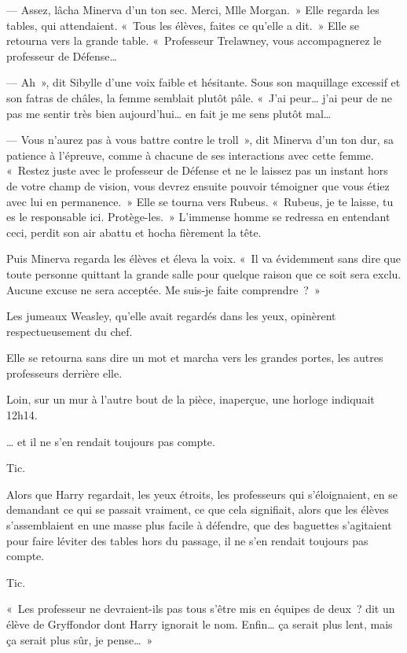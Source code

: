 --- Assez, lâcha Minerva d'un ton sec. Merci, Mlle Morgan.~» Elle regarda les tables, qui attendaient. «~Tous les élèves, faites ce qu'elle a dit.~» Elle se retourna vers la grande table. «~Professeur Trelawney, vous accompagnerez le professeur de Défense…

--- Ah~», dit Sibylle d'une voix faible et hésitante. Sous son maquillage excessif et son fatras de châles, la femme semblait plutôt pâle. «~J'ai peur… j'ai peur de ne pas me sentir très bien aujourd'hui… en fait je me sens plutôt mal…

--- Vous n'aurez pas à vous battre contre le troll~», dit Minerva d'un ton dur, sa patience à l'épreuve, comme à chacune de ses interactions avec cette femme. «~Restez juste avec le professeur de Défense et ne le laissez pas un instant hors de votre champ de vision, vous devrez ensuite pouvoir témoigner que vous étiez avec lui en permanence.~» Elle se tourna vers Rubeus. «~Rubeus, je te laisse, tu es le responsable ici. Protège-les.~» L'immense homme se redressa en entendant ceci, perdit son air abattu et hocha fièrement la tête.

Puis Minerva regarda les élèves et éleva la voix. «~Il va évidemment sans dire que toute personne quittant la grande salle pour quelque raison que ce soit sera exclu. Aucune excuse ne sera acceptée. Me suis-je faite comprendre~?~»

Les jumeaux Weasley, qu'elle avait regardés dans les yeux, opinèrent respectueusement du chef.

Elle se retourna sans dire un mot et marcha vers les grandes portes, les autres professeurs derrière elle.

Loin, sur un mur à l'autre bout de la pièce, inaperçue, une horloge indiquait 12h14.

… et il ne s'en rendait toujours pas compte.

Tic.

Alors que Harry regardait, les yeux étroits, les professeurs qui s'éloignaient, en se demandant ce qui se passait vraiment, ce que cela signifiait, alors que les élèves s'assemblaient en une masse plus facile à défendre, que des baguettes s'agitaient pour faire léviter des tables hors du passage, il ne s'en rendait toujours pas compte.

Tic.

«~Les professeur ne devraient-ils pas tous s'être mis en équipes de deux~? dit un élève de Gryffondor dont Harry ignorait le nom. Enfin… ça serait plus lent, mais ça serait plus sûr, je pense…~»

